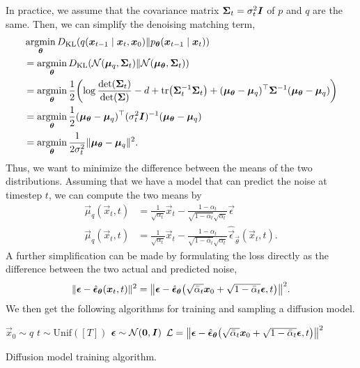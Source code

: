 In practice, we assume that the covariance matrix $\bm{\Sigma}_t = \sigma_t^2 \bm{I}$ of $p$ and $q$ are the same. Then, we can simplify the denoising matching term,
\begin{align*}
    &\argmin_{\vec{\theta}} D_{\mathrm{KL}}(q(\vec{x}_{t-1} \mid \vec{x}_t, \vec{x}_0) \lVert p_{\vec{\theta}}(\vec{x}_{t-1} \mid \vec{x}_t)) \\
    & = \argmin_{\vec{\theta}} D_{\mathrm{KL}}\lft( \mathcal{N}(\vec{\mu}_q, \mat{\Sigma}_t) \lVert \mathcal{N}(\vec{\mu}_{\vec{\theta}}, \mat{\Sigma}_t) \rgt) \\
    & = \argmin_{\vec{\theta}} \frac{1}{2} \lft( \log \frac{\det{\mat{\Sigma}_t}}{\det{\mat{\Sigma}}} - d + \tr{\inv{\mat{\Sigma}_t} \mat{\Sigma}_t} + \transpose{(\vec{\mu}_{\vec{\theta}} - \vec{\mu}_q)} \inv{\mat{\Sigma}} (\vec{\mu}_{\vec{\theta}} - \vec{\mu}_q) \rgt) \\
    & = \argmin_{\vec{\theta}} \frac{1}{2} \transpose{(\vec{\mu}_{\vec{\theta}} - \vec{\mu}_q)} \inv{(\sigma^2_t \mat{I})} (\vec{\mu}_{\vec{\theta}} - \vec{\mu}_q) \\
    & = \argmin_{\vec{\theta}} \frac{1}{2\sigma_t^2} \| \vec{\mu}_{\vec{\theta}} - \vec{\mu}_q \|^2.
\end{align*}
Thus, we want to minimize the difference between the means of the two distributions. Assuming that we have a model that can predict the noise at timestep $t$, we can compute the two means by
\begin{align*}
    \vec{\mu}_q(\vec{x}_t, t) &= \frac{1}{\sqrt{\alpha_t}} \vec{x}_t - \frac{1 - \alpha_t}{\sqrt{1 - \bar{\alpha}_t} \sqrt{\alpha_t}} \vec{\epsilon} \\
    \vec{\mu}_q(\vec{x}_t, t) &= \frac{1}{\sqrt{\alpha_t}} \vec{x}_t - \frac{1 - \alpha_t}{\sqrt{1 - \bar{\alpha}_t} \sqrt{\alpha_t}} \hat{\vec{\epsilon}}_{\vec{\theta}}(\vec{x}_t, t).
\end{align*}
A further simplification can be made by formulating the loss directly as the difference between the two actual and predicted noise, \[
    \| \vec{\epsilon} - \hat{\vec{\epsilon}}_{\vec{\theta}}(\vec{x}_t, t) \|^2 = \lft\| \vec{\epsilon} - \hat{\vec{\epsilon}}_{\vec{\theta}}\lft(\sqrt{\bar{\alpha}_t} \vec{x}_0 + \sqrt{1 - \bar{\alpha}_t}\vec{\epsilon}, t\rgt) \rgt\|^2.
\]
We then get the following algorithms for training and sampling a diffusion model.

\begin{algorithm}
    \begin{algorithmic}[1]
        \State $\vec{x}_0 \sim q$
        \State $t \sim \mathrm{Unif}([T])$
        \State $\bm{\epsilon} \sim \mathcal{N}(\bm{0}, \bm{I})$
        \State $\mathcal{L} = \lft\| \vec{\epsilon} - \hat{\vec{\epsilon}}_{\vec{\theta}}\lft( \sqrt{\bar{\alpha}_t} \vec{x}_0 + \sqrt{1 - \bar{\alpha}_t} \vec{\epsilon}, t \rgt) \rgt\|^2$
        \EndWhile
    \end{algorithmic}
    \caption{Diffusion model training algorithm.}
\end{algorithm}

